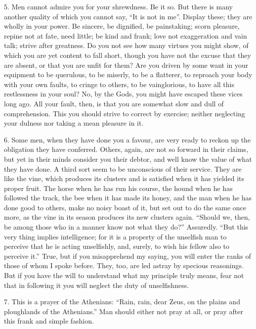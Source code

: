 \documentclass{book}
\begin{document}
5. Men cannot admire you for your shrewdness. Be it so. But there is
many another quality of which you cannot say, ``It is not in me''.
Display these; they are wholly in your power. Be sincere, be
dignified, be painstaking; scorn pleasure, repine not at fate, need
little; be kind and frank; love not exaggeration and vain talk; strive
after greatness. Do you not see how many virtues you might show, of
which you are yet content to fall short, though you have not the
excuse that they are absent, or that you are unfit for them? Are you
driven by some want in your equipment to be querulous, to be miserly,
to be a flatterer, to reproach your body with your own faults, to
cringe to others, to be vainglorious, to have all this restlessness in
your soul? No, by the Gods, you might have escaped these vices long
ago. All your fault, then, is that you are somewhat slow and dull of
comprehension. This you should strive to correct by exercise; neither
neglecting your dulness nor taking a mean pleasure in it.

6. Some men, when they have done you a favour, are very ready to
reckon up the obligation they have conferred. Others, again, are not
so forward in their claims, but yet in their minds consider you their
debtor, and well know the value of what they have done. A third sort
seem to be unconscious of their service. They are like the vine, which
produces its clusters and is satisfied when it has yielded its proper
fruit. The horse when he has run his course, the hound when he has
followed the track, the bee when it has made its honey, and the man
when he has done good to others, make no noisy boast of it, but set
out to do the same once more, as the vine in its season produces its
new clusters again. ``Should we, then, be among those who in a manner
know not what they do?'' Assuredly. ``But this very thing implies
intelligence; for it is a property of the unselfish man to perceive
that he is acting unselfishly, and, surely, to wish his fellow also to
perceive it.'' True, but if you misapprehend my saying, you will enter
the ranks of those of whom I spoke before. They, too, are led astray
by specious reasonings. But if you have the will to understand what my
principle truly means, fear not that in following it you will neglect
the duty of unselfishness.

7. This is a prayer of the Athenians: ``Rain, rain, dear Zeus, on the
plains and ploughlands of the Athenians.'' Man should either not pray
at all, or pray after this frank and simple fashion.
\end{document}
